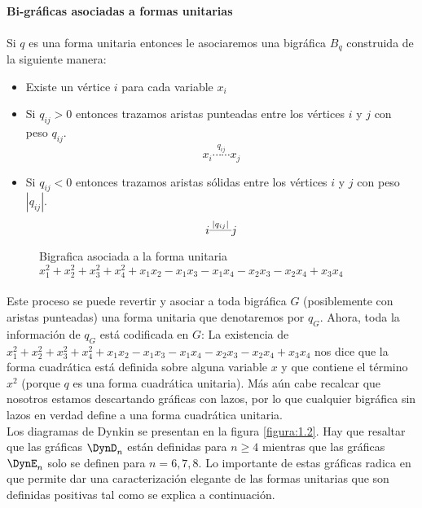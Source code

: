 \paragraph*{}
\textbf{Bi-gráficas asociadas a formas unitarias}
\paragraph*{}
Si $q$ es una forma unitaria entonces le asociaremos una bigráfica \textbf{$B$}$_{q}$ construida de la siguiente manera:
\begin{itemize}
    \item Existe un vértice $i$ para cada variable $x_{i}$
    \item Si $q_{ij} > 0$ entonces trazamos aristas punteadas entre los vértices $i$ y $j$ con peso $q_{ij}$.$$x_{i}\overset{q_{ij}}{\cdots\cdots}x_{j}$$
    \item Si $q_{ij} < 0$ entonces trazamos aristas sólidas entre los vértices $i$ y $j$ con peso $|q_{ij}|$.$$i\overset{|q_{ij}|}{\rule[1mm]{7mm}{0.1mm}}j$$
\end{itemize}
\begin{figure}[H]
\begin{center}
\caption{Bigrafica asociada a la forma unitaria $x_{1}^2 + x_{2}^2 + x_{3}^2 + x_{4}^2 + x_{1}x_{2} - x_{1}x_{3} - x_{1}x_{4} - x_{2}x_{3} - x_{2}x_{4} + x_{3}x_{4}$}
\label{figura:1.1}
\end{center}
\end{figure}
\paragraph*{}
Este proceso se puede revertir y asociar a toda bigráfica $G$ (posiblemente con aristas punteadas) una forma unitaria que denotaremos por \textbf{$q_{G}$}. Ahora, toda la información de $q_{G}$ está codificada en $G$: La existencia de $x_{1}^2 + x_{2}^2 + x_{3}^2 + x_{4}^2 + x_{1}x_{2} - x_{1}x_{3} - x_{1}x_{4} - x_{2}x_{3} - x_{2}x_{4} + x_{3}x_{4}$ nos dice que la forma cuadrática está definida sobre alguna variable $x$ y que contiene el término $x^{2}$ (porque $q$ es una forma cuadrática unitaria). Más aún cabe recalcar que nosotros estamos descartando gráficas con lazos, por lo que cualquier bigráfica sin lazos en verdad define a una forma cuadrática unitaria.\\
Los diagramas de Dynkin se presentan en la figura \ref{figura:1.2}. Hay que resaltar que las gráficas $\DynD_{n}$ están definidas para $n \geq 4$ mientras que las gráficas $\DynE_{n}$ solo se definen para $n = 6, 7, 8$. Lo importante de estas gráficas radica en que permite dar una caracterización elegante de las formas unitarias que son definidas positivas tal como se explica a continuación.


